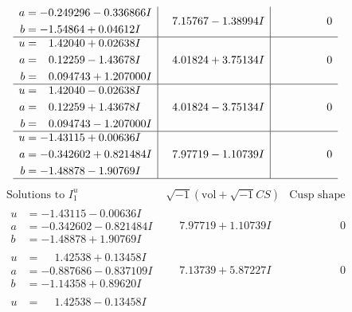 \documentclass[1p]{elsarticle_modified}
\theoremstyle{definition}
\newcommand{\I}{\sqrt{-1}}
\begin{document}
$$\begin{array}{c|c|c}
\begin{aligned}
a &= -0.249296 - 0.336866 I \\
b &= -1.54864 + 0.04612 I\end{aligned}
 & \phantom{-}7.15767 - 1.38994 I & \phantom{-0.000000 } 0 \\ \hline\begin{aligned}
u &= \phantom{-}1.42040 + 0.02638 I \\
a &= \phantom{-}0.12259 - 1.43678 I \\
b &= \phantom{-}0.094743 + 1.207000 I\end{aligned}
 & \phantom{-}4.01824 + 3.75134 I & \phantom{-0.000000 } 0 \\ \hline\begin{aligned}
u &= \phantom{-}1.42040 - 0.02638 I \\
a &= \phantom{-}0.12259 + 1.43678 I \\
b &= \phantom{-}0.094743 - 1.207000 I\end{aligned}
 & \phantom{-}4.01824 - 3.75134 I & \phantom{-0.000000 } 0 \\ \hline\begin{aligned}
u &= -1.43115 + 0.00636 I \\
a &= -0.342602 + 0.821484 I \\
b &= -1.48878 - 1.90769 I\end{aligned}
 & \phantom{-}7.97719 - 1.10739 I & \phantom{-0.000000 } 0\\
 \hline 
 \end{array}$$\newpage$$\begin{array}{c|c|c}  
\text{Solutions to }I^u_{1}& \I (\text{vol} + \sqrt{-1}CS) & \text{Cusp shape}\\
 \hline 
\begin{aligned}
u &= -1.43115 - 0.00636 I \\
a &= -0.342602 - 0.821484 I \\
b &= -1.48878 + 1.90769 I\end{aligned}
 & \phantom{-}7.97719 + 1.10739 I & \phantom{-0.000000 } 0 \\ \hline\begin{aligned}
u &= \phantom{-}1.42538 + 0.13458 I \\
a &= -0.887686 - 0.837109 I \\
b &= -1.14358 + 0.89620 I\end{aligned}
 & \phantom{-}7.13739 + 5.87227 I & \phantom{-0.000000 } 0 \\ \hline\begin{aligned}
u &= \phantom{-}1.42538 - 0.13458 I \\

\end{aligned}
\end{array}$$
\end{document}
